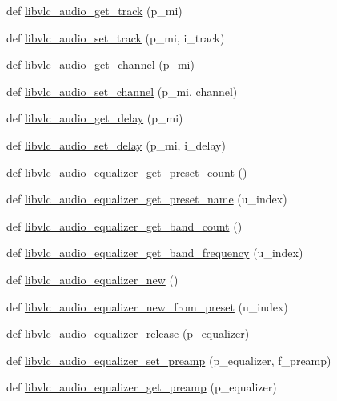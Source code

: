 \begin{DoxyCompactItemize}
\item 
def \hyperlink{namespacevlc_aacb5cb891887883b6969a152656bfb75}{libvlc\+\_\+audio\+\_\+get\+\_\+track} (p\+\_\+mi)
\item 
def \hyperlink{namespacevlc_a98ac26f41a3d8271d1ec63d4a5c40289}{libvlc\+\_\+audio\+\_\+set\+\_\+track} (p\+\_\+mi, i\+\_\+track)
\item 
def \hyperlink{namespacevlc_aaea673f933311af160dd682a91e0cd89}{libvlc\+\_\+audio\+\_\+get\+\_\+channel} (p\+\_\+mi)
\item 
def \hyperlink{namespacevlc_abc0358f7a4053006f13577861532937c}{libvlc\+\_\+audio\+\_\+set\+\_\+channel} (p\+\_\+mi, channel)
\item 
def \hyperlink{namespacevlc_a62ec4fd04e704236c3bb48f2bada26e1}{libvlc\+\_\+audio\+\_\+get\+\_\+delay} (p\+\_\+mi)
\item 
def \hyperlink{namespacevlc_a4f69c99e5eaf09175dd4353d56e934d8}{libvlc\+\_\+audio\+\_\+set\+\_\+delay} (p\+\_\+mi, i\+\_\+delay)
\item 
def \hyperlink{namespacevlc_a8cabffd55794bdd6207aafcebaaba562}{libvlc\+\_\+audio\+\_\+equalizer\+\_\+get\+\_\+preset\+\_\+count} ()
\item 
def \hyperlink{namespacevlc_a77eb7037c0e4a29b89dc541b0fac240d}{libvlc\+\_\+audio\+\_\+equalizer\+\_\+get\+\_\+preset\+\_\+name} (u\+\_\+index)
\item 
def \hyperlink{namespacevlc_ac28be065813cf41bff2b697298292012}{libvlc\+\_\+audio\+\_\+equalizer\+\_\+get\+\_\+band\+\_\+count} ()
\item 
def \hyperlink{namespacevlc_a14f45eb50bd638168970304368353603}{libvlc\+\_\+audio\+\_\+equalizer\+\_\+get\+\_\+band\+\_\+frequency} (u\+\_\+index)
\item 
def \hyperlink{namespacevlc_a12209b15e0da9a0481e4f7571f617dda}{libvlc\+\_\+audio\+\_\+equalizer\+\_\+new} ()
\item 
def \hyperlink{namespacevlc_aeaf5e53ef0f358b71fc1796b0bc0a114}{libvlc\+\_\+audio\+\_\+equalizer\+\_\+new\+\_\+from\+\_\+preset} (u\+\_\+index)
\item 
def \hyperlink{namespacevlc_ae82eed728fae30f533e3bdaaeeb2fb24}{libvlc\+\_\+audio\+\_\+equalizer\+\_\+release} (p\+\_\+equalizer)
\item 
def \hyperlink{namespacevlc_a10afe2e2760d5e0929afd7544bd08fc7}{libvlc\+\_\+audio\+\_\+equalizer\+\_\+set\+\_\+preamp} (p\+\_\+equalizer, f\+\_\+preamp)
\item 
def \hyperlink{namespacevlc_a0f558cf51d137d01323634077b0f4b4e}{libvlc\+\_\+audio\+\_\+equalizer\+\_\+get\+\_\+preamp} (p\+\_\+equalizer)

\end{DoxyCompactItemize}
